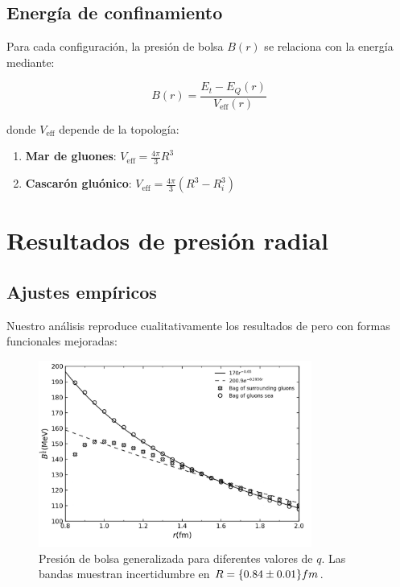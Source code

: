 \subsection{Energía de confinamiento}
Para cada configuración, la presión de bolsa $B(r)$ se relaciona con la energía mediante:

\begin{equation}
B(r) = \frac{E_t - E_Q(r)}{V_{\text{eff}}(r)} \label{eq-Bdef}
\end{equation}

donde $V_{\text{eff}}$ depende de la topología:

\begin{enumerate}[ i. ]
    \item \textbf{Mar de gluones}: $V_{\text{eff}} = \frac{4\pi}{3}R^3$
    \item \textbf{Cascarón gluónico}: $V_{\text{eff}} = \frac{4\pi}{3}(R^3 - R_i^3)$
\end{enumerate}

\section{Resultados de presión radial}
\subsection{Ajustes empíricos}
Nuestro análisis reproduce cualitativamente los resultados de \cite{tan2019} pero con formas funcionales mejoradas:

\begin{figure}[h]
    \centering
    \includegraphics[width=0.8\textwidth]{./Images/B(R).png}
    \caption{Presión de bolsa generalizada para diferentes valores de $q$. Las bandas muestran incertidumbre en $R = \qty{0.84 \pm 0.01}{fm}$.}
    \label{fig:Bpressure}
\end{figure}

